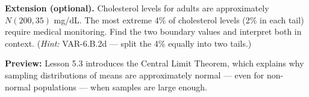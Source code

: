 \documentclass[10pt]{article}
\begin{document}
\begin{extensionbox}
\textbf{Extension (optional).}
Cholesterol levels for adults are approximately $N(200, 35)$ mg/dL. The most extreme
4\% of cholesterol levels (2\% in each tail) require medical monitoring. Find the
two boundary values and interpret both in context. (\textit{Hint:} VAR-6.B.2d ---
split the 4\% equally into two tails.)
\end{extensionbox}

\begin{reflectionbox}
\textbf{Preview:} Lesson 5.3 introduces the Central Limit Theorem, which explains why
sampling distributions of means are approximately normal --- even for non-normal
populations --- when samples are large enough.
\end{reflectionbox}
\end{document}
